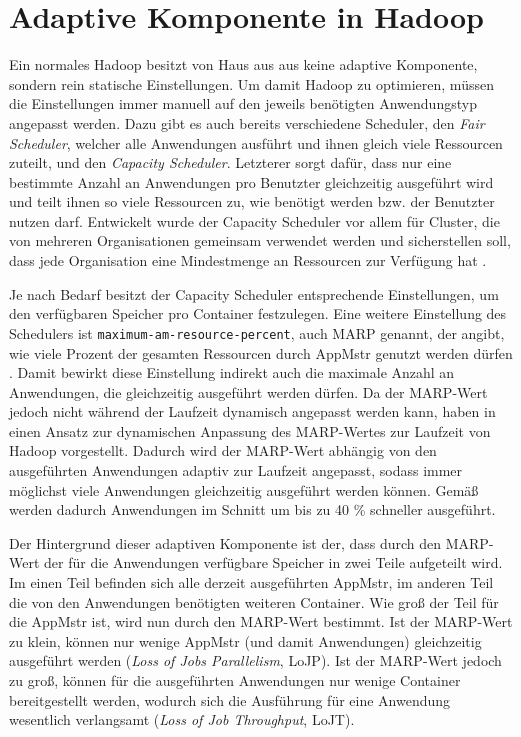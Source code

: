 \section{Adaptive Komponente in Hadoop}\label{sec:inriaSetting}

Ein normales Hadoop besitzt von Haus aus aus keine adaptive Komponente, sondern rein statische Einstellungen. Um damit Hadoop zu optimieren, müssen die Einstellungen immer manuell auf den jeweils benötigten Anwendungstyp angepasst werden. Dazu gibt es auch bereits verschiedene Scheduler, den \emph{Fair Scheduler}, welcher alle Anwendungen ausführt und ihnen gleich viele Ressourcen zuteilt, und den \emph{Capacity Scheduler}. Letzterer sorgt dafür, dass nur eine bestimmte Anzahl an Anwendungen pro Benutzter gleichzeitig ausgeführt wird und teilt ihnen so viele Ressourcen zu, wie benötigt werden bzw. der Benutzter nutzen darf. Entwickelt wurde der Capacity Scheduler vor allem für Cluster, die von mehreren Organisationen gemeinsam verwendet werden und sicherstellen soll, dass jede Organisation eine Mindestmenge an Ressourcen zur Verfügung hat \cite{HadoopCapScheduler271}.

Je nach Bedarf besitzt der Capacity Scheduler entsprechende Einstellungen, um \zB den verfügbaren Speicher pro Container festzulegen. Eine weitere Einstellung des Schedulers ist \texttt{maximum-am-resource-percent}, auch MARP genannt, der angibt, wie viele Prozent der gesamten Ressourcen durch \ac{AppMstr} genutzt werden dürfen \cite{HadoopCapScheduler271}. Damit bewirkt diese Einstellung indirekt auch die maximale Anzahl an Anwendungen, die gleichzeitig ausgeführt werden dürfen. Da der MARP-Wert jedoch nicht während der Laufzeit dynamisch angepasst werden kann, haben \citeauthor{zhang2016} in \cite{zhang2016} einen Ansatz zur dynamischen Anpassung des MARP-Wertes zur Laufzeit von Hadoop vorgestellt. Dadurch wird der MARP-Wert abhängig von den ausgeführten Anwendungen adaptiv zur Laufzeit angepasst, sodass immer möglichst viele Anwendungen gleichzeitig ausgeführt werden können. Gemäß \citeauthor{zhang2016} werden dadurch Anwendungen im Schnitt um bis zu 40 \% schneller ausgeführt.

Der Hintergrund dieser adaptiven Komponente ist der, dass durch den MARP-Wert der für die Anwendungen verfügbare Speicher in zwei Teile aufgeteilt wird. Im einen Teil befinden sich alle derzeit ausgeführten \ac{AppMstr}, im anderen Teil die von den Anwendungen benötigten weiteren Container. Wie groß der Teil für die \ac{AppMstr} ist, wird nun durch den MARP-Wert bestimmt. Ist der MARP-Wert zu klein, können nur wenige \ac{AppMstr} (und damit Anwendungen) gleichzeitig ausgeführt werden (\emph{Loss of Jobs Parallelism}, LoJP). Ist der MARP-Wert jedoch zu groß, können für die ausgeführten Anwendungen nur wenige Container bereitgestellt werden, wodurch sich die Ausführung für eine Anwendung wesentlich verlangsamt (\emph{Loss of Job Throughput}, LoJT)\cite{zhang2016}.

